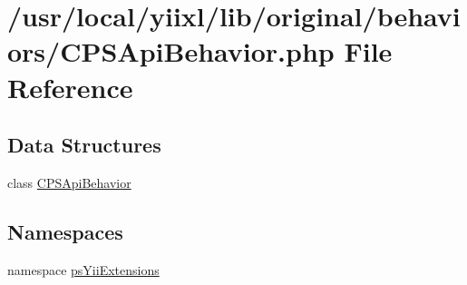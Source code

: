 \hypertarget{CPSApiBehavior_8php}{
\section{/usr/local/yiixl/lib/original/behaviors/CPSApiBehavior.php File Reference}
\label{CPSApiBehavior_8php}
}
\subsection*{Data Structures}
\begin{DoxyCompactItemize}
\item 
class \hyperlink{classCPSApiBehavior}{CPSApiBehavior}
\end{DoxyCompactItemize}
\subsection*{Namespaces}
\begin{DoxyCompactItemize}
\item 
namespace \hyperlink{namespacepsYiiExtensions}{psYiiExtensions}
\end{DoxyCompactItemize}
